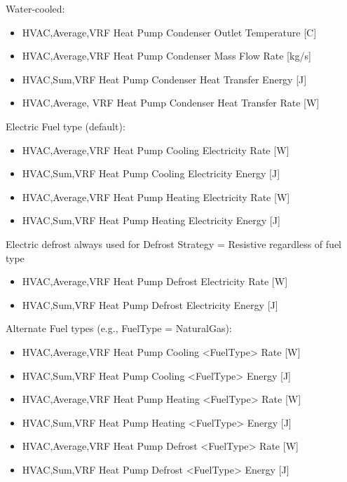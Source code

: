 Water-cooled:

\begin{itemize}
\item
  HVAC,Average,VRF Heat Pump Condenser Outlet Temperature {[}C{]}
\item
  HVAC,Average,VRF Heat Pump Condenser Mass Flow Rate {[}kg/s{]}
\item
  HVAC,Sum,VRF Heat Pump Condenser Heat Transfer Energy {[}J{]}
\item
  HVAC,Average, VRF Heat Pump Condenser Heat Transfer Rate {[}W{]}
\end{itemize}

Electric Fuel type (default):

\begin{itemize}
\item
  HVAC,Average,VRF Heat Pump Cooling Electricity Rate {[}W{]}
\item
  HVAC,Sum,VRF Heat Pump Cooling Electricity Energy {[}J{]}
\item
  HVAC,Average,VRF Heat Pump Heating Electricity Rate {[}W{]}
\item
  HVAC,Sum,VRF Heat Pump Heating Electricity Energy {[}J{]}
\end{itemize}

Electric defrost always used for Defrost Strategy = Resistive regardless of fuel type

\begin{itemize}
\item
  HVAC,Average,VRF Heat Pump Defrost Electricity Rate {[}W{]}
\item
  HVAC,Sum,VRF Heat Pump Defrost Electricity Energy {[}J{]}
\end{itemize}

Alternate Fuel types (e.g., FuelType = NaturalGas):

\begin{itemize}
\item
  HVAC,Average,VRF Heat Pump Cooling \textless{}FuelType\textgreater{} Rate {[}W{]}
\item
  HVAC,Sum,VRF Heat Pump Cooling \textless{}FuelType\textgreater{} Energy {[}J{]}
\item
  HVAC,Average,VRF Heat Pump Heating \textless{}FuelType\textgreater{} Rate {[}W{]}
\item
  HVAC,Sum,VRF Heat Pump Heating \textless{}FuelType\textgreater{} Energy {[}J{]}
\item
  HVAC,Average,VRF Heat Pump Defrost \textless{}FuelType\textgreater{} Rate {[}W{]}
\item
  HVAC,Sum,VRF Heat Pump Defrost \textless{}FuelType\textgreater{} Energy {[}J{]}
\end{itemize}


